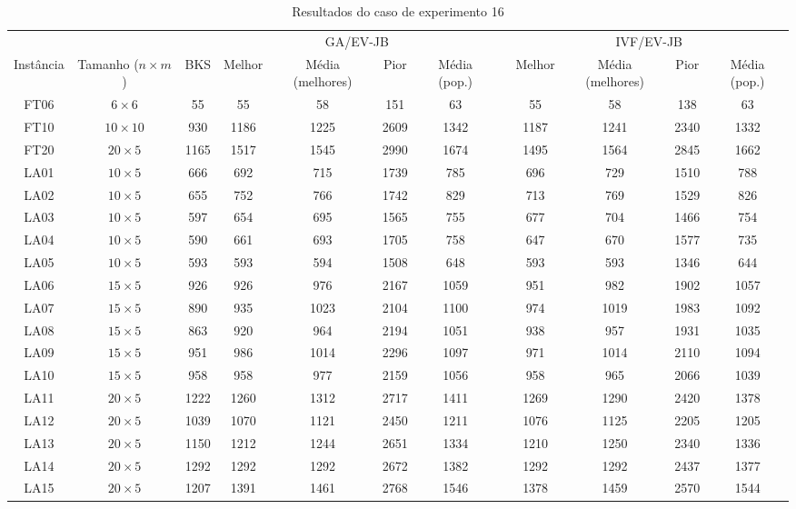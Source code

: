 \begin{sidewaystable}
\caption{Resultados do caso de experimento 16}
\centering
\label{experimento16}
\begin{tabular}{cccccccccccc}
\toprule
& & & \multicolumn{4}{c}{GA/EV-JB} & & \multicolumn{4}{c}{IVF/EV-JB} \\
\cmidrule(c){4-7}
\cmidrule(c){9-12}
Inst\^{a}ncia & Tamanho ($n \times m$) & BKS & Melhor & M\'{e}dia (melhores) & Pior & M\'{e}dia (pop.) & & Melhor & M\'{e}dia (melhores) & Pior & M\'{e}dia (pop.) \\
\midrule
FT06 & $6 \times 6$ & 55 & 55 & 58 & 151 & 63 & & 55 & 58 & 138 & 63 \\
FT10 & $10 \times 10$ & 930 & 1186 & 1225 & 2609 & 1342 & & 1187 & 1241 & 2340 & 1332 \\
FT20 & $20 \times 5$ & 1165 & 1517 & 1545 & 2990 & 1674 & & 1495 & 1564 & 2845 & 1662 \\
LA01 & $10 \times 5$ & 666 & 692 & 715 & 1739 & 785 & & 696 & 729 & 1510 & 788 \\
LA02 & $10 \times 5$ & 655 & 752 & 766 & 1742 & 829 & & 713 & 769 & 1529 & 826 \\
LA03 & $10 \times 5$ & 597 & 654 & 695 & 1565 & 755 & & 677 & 704 & 1466 & 754 \\
LA04 & $10 \times 5$ & 590 & 661 & 693 & 1705 & 758 & & 647 & 670 & 1577 & 735 \\
LA05 & $10 \times 5$ & 593 & 593 & 594 & 1508 & 648 & & 593 & 593 & 1346 & 644 \\
LA06 & $15 \times 5$ & 926 & 926 & 976 & 2167 & 1059 & & 951 & 982 & 1902 & 1057 \\
LA07 & $15 \times 5$ & 890 & 935 & 1023 & 2104 & 1100 & & 974 & 1019 & 1983 & 1092 \\
LA08 & $15 \times 5$ & 863 & 920 & 964 & 2194 & 1051 & & 938 & 957 & 1931 & 1035 \\
LA09 & $15 \times 5$ & 951 & 986 & 1014 & 2296 & 1097 & & 971 & 1014 & 2110 & 1094 \\
LA10 & $15 \times 5$ & 958 & 958 & 977 & 2159 & 1056 & & 958 & 965 & 2066 & 1039 \\
LA11 & $20 \times 5$ & 1222 & 1260 & 1312 & 2717 & 1411 & & 1269 & 1290 & 2420 & 1378 \\
LA12 & $20 \times 5$ & 1039 & 1070 & 1121 & 2450 & 1211 & & 1076 & 1125 & 2205 & 1205 \\
LA13 & $20 \times 5$ & 1150 & 1212 & 1244 & 2651 & 1334 & & 1210 & 1250 & 2340 & 1336 \\
LA14 & $20 \times 5$ & 1292 & 1292 & 1292 & 2672 & 1382 & & 1292 & 1292 & 2437 & 1377 \\
LA15 & $20 \times 5$ & 1207 & 1391 & 1461 & 2768 & 1546 & & 1378 & 1459 & 2570 & 1544 \\
\bottomrule
\end{tabular}
\end{sidewaystable}
